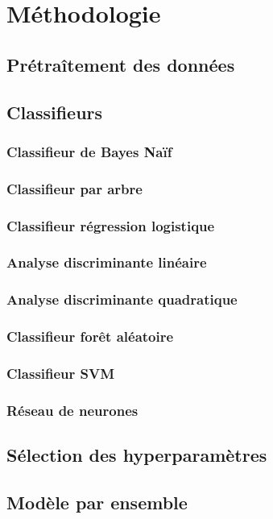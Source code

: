 \section{Méthodologie}

\subsection{Prétraîtement des données}

\subsection{Classifieurs}

\subsubsection{Classifieur de Bayes Naïf}

\subsubsection{Classifieur par arbre}

\subsubsection{Classifieur régression logistique}

\subsubsection{Analyse discriminante linéaire}

\subsubsection{Analyse discriminante quadratique}

\subsubsection{Classifieur forêt aléatoire}

\subsubsection{Classifieur SVM}

\subsubsection{Réseau de neurones}

\subsection{Sélection des hyperparamètres}

\subsection{Modèle par ensemble}

